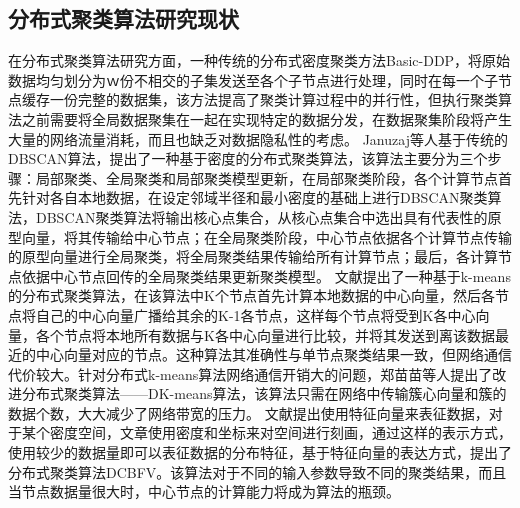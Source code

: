 \subsection{分布式聚类算法研究现状}
在分布式聚类算法研究方面，一种传统的分布式密度聚类方法Basic-DDP，将原始数据均匀划分为ｗ份不相交的子集发送至各个子节点进行处理，同时在每一个子节点缓存一份完整的数据集，该方法提高了聚类计算过程中的并行性，但执行聚类算法之前需要将全局数据聚集在一起在实现特定的数据分发，在数据聚集阶段将产生大量的网络流量消耗，而且也缺乏对数据隐私性的考虑。
Januzaj等人基于传统的DBSCAN算法，提出了一种基于密度的分布式聚类算法，该算法主要分为三个步骤：局部聚类、全局聚类和局部聚类模型更新，在局部聚类阶段，各个计算节点首先针对各自本地数据，在设定邻域半径和最小密度的基础上进行DBSCAN聚类算法，DBSCAN聚类算法将输出核心点集合，从核心点集合中选出具有代表性的原型向量，将其传输给中心节点；在全局聚类阶段，中心节点依据各个计算节点传输的原型向量进行全局聚类，将全局聚类结果传输给所有计算节点；最后，各计算节点依据中心节点回传的全局聚类结果更新聚类模型。
文献\cite{kantabutra2000parallel}提出了一种基于k-means的分布式聚类算法，在该算法中K个节点首先计算本地数据的中心向量，然后各节点将自己的中心向量广播给其余的K-1各节点，这样每个节点将受到K各中心向量，各个节点将本地所有数据与K各中心向量进行比较，并将其发送到离该数据最近的中心向量对应的节点。这种算法其准确性与单节点聚类结果一致，但网络通信代价较大。针对分布式k-means算法网络通信开销大的问题，郑苗苗等人提出了改进分布式聚类算法——DK-means算法，该算法只需在网络中传输簇心向量和簇的数据个数，大大减少了网络带宽的压力。
文献\cite{李锁花基于特征向量的分布式聚类算法}提出使用特征向量来表征数据，对于某个密度空间，文章使用密度和坐标来对空间进行刻画，通过这样的表示方式，使用较少的数据量即可以表征数据的分布特征，基于特征向量的表达方式，提出了分布式聚类算法DCBFV。该算法对于不同的输入参数导致不同的聚类结果，而且当节点数据量很大时，中心节点的计算能力将成为算法的瓶颈。

